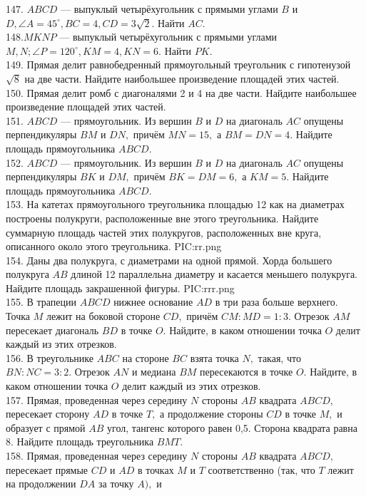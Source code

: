 147. $ABCD$ --- выпуклый четырёхугольник с прямыми углами $B$ и $D,\angle A=45^\circ, BC=4, CD=3\sqrt{2}.$ Найти $AC.$\\
148.$MKNP$ --- выпуклый четырёхугольник с прямыми углами $M, N; \angle P=120^\circ, KM=4, KN=6.$ Найти $PK.$\\
149. Прямая делит равнобедренный прямоугольный треугольник с гипотенузой $\sqrt{8}$ на две части. Найдите наибольшее произведение площадей этих частей.\\
150. Прямая делит ромб с диагоналями 2 и 4 на две части. Найдите наибольшее произведение площадей
этих частей.\\
151. $ABCD$ --- прямоугольник. Из вершин $B$ и $D$ на диагональ $AC$ опущены перпендикуляры $BM$ и $DN,$
причём $MN=15,$ а $BM=DN=4.$ Найдите площадь прямоугольника $ABCD.$\\
152. $ABCD$ --- прямоугольник. Из вершин $B$ и $D$ на диагональ $AC$ опущены перпендикуляры $BK$ и $DM,$ причём $BK=DM=6,$ а $KM=5.$ Найдите площадь прямоугольника $ABCD.$\\
153. На катетах прямоугольного треугольника площадью 12 как на диаметрах построены полукруги, расположенные вне этого треугольника. Найдите суммарную площадь частей этих полукругов, расположенных вне круга, описанного около этого треугольника.
{{PIC:rr.png}}\\
154. Даны два полукруга, с диаметрами на одной прямой.
Хорда большего полукруга $AB$ длиной 12 параллельна диаметру и касается
меньшего полукруга. Найдите площадь закрашенной фигуры.
{{PIC:rrr.png}}\\
155. В трапеции $ABCD$ нижнее основание $AD$ в три раза больше верхнего. Точка $M$ лежит на боковой
стороне $CD,$ причём $CM:MD=1:3.$ Отрезок $AM$ пересекает диагональ $BD$ в точке $O.$ Найдите, в
каком отношении точка $O$ делит каждый из этих отрезков.\\
156. В треугольнике $ABC$ на стороне $BC$ взята точка $N,$ такая, что $BN : NC=3:2.$ Отрезок $AN$ и медиана
$BM$ пересекаются в точке $O.$ Найдите, в каком отношении точка $O$ делит каждый из этих отрезков.\\
157. Прямая, проведенная через середину $N$ стороны $AB$ квадрата $ABCD,$ пересекает сторону $AD$ в точке
$T,$ а продолжение стороны $CD$ в точке $M,$ и образует с прямой $AB$ угол, тангенс которого равен 0,5.
Сторона квадрата равна 8. Найдите площадь треугольника $BMT.$\\
158. Прямая, проведенная через середину $N$ стороны $AB$ квадрата $ABCD,$ пересекает прямые $CD$ и
$AD$ в точках $M$ и $T$ соответственно (так, что $T$ лежит на продолжении $DA$ за точку $A),$ и
